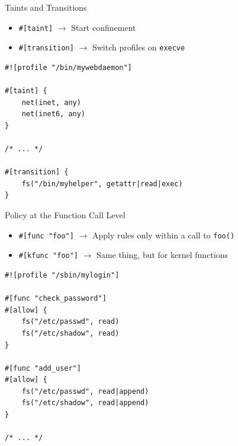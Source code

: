 \documentclass[12pt, dvipsnames, aspectratio=169]{beamer}
\begin{document}
\begin{frame}[c, fragile]{Taints and Transitions}
\begin{itemize}
    \item \lstinline[language=bpfbox]|#[taint]|  $\rightarrow$ Start confinement
    \item \lstinline[language=bpfbox]|#[transition]|  $\rightarrow$ Switch profiles on \texttt{execve}
\end{itemize}
\vfill
\begin{lstlisting}[language=bpfbox, xleftmargin=.25\textwidth]
#![profile "/bin/mywebdaemon"]

#[taint] {
    net(inet, any)
    net(inet6, any)
}

/* ... */

#[transition] {
    fs("/bin/myhelper", getattr|read|exec)
}
\end{lstlisting}
\end{frame}

\begin{frame}[c, fragile]{Policy at the Function Call Level}
\begin{itemize}
    \item \lstinline[language=bpfbox]|#[func "foo"]|  $\rightarrow$ Apply rules only within a call to \texttt{foo()}
    \item \lstinline[language=bpfbox]|#[kfunc "foo"]|  $\rightarrow$ Same thing, but for kernel functions
\end{itemize}
\vfill
\begin{lstlisting}[language=bpfbox, xleftmargin=.25\textwidth]
#![profile "/sbin/mylogin"]

#[func "check_password"]
#[allow] {
    fs("/etc/passwd", read)
    fs("/etc/shadow", read)
}

#[func "add_user"]
#[allow] {
    fs("/etc/passwd", read|append)
    fs("/etc/shadow", read|append)
}

/* ... */
\end{lstlisting}
\end{frame}

%
\end{document}
